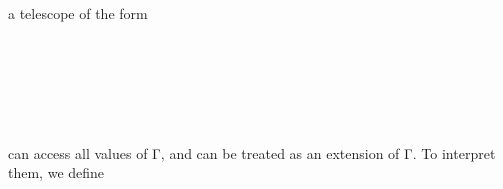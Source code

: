 \begin{code}%
%
\>[2]\AgdaSpace{}%
%
\>[11]\AgdaSpace{}%
\AgdaSpace{}%
\AgdaSymbol{=}\AgdaSpace{}%
\<%
\\
%
\>[2]\AgdaSpace{}%
\AgdaSpace{}%
\AgdaSpace{}%
%
\>[11]\AgdaSpace{}%
\AgdaSpace{}%
\AgdaSymbol{=}\AgdaSpace{}%
\AgdaFunction{Σ[}\AgdaSpace{}%
\AgdaSpace{}%
\AgdaSpace{}%
\AgdaSpace{}%
\AgdaSpace{}%
\AgdaSpace{}%
\AgdaSpace{}%
\AgdaFunction{]}\AgdaSpace{}%
\AgdaSpace{}%
\AgdaSymbol{(}\AgdaSpace{}%
\AgdaOperator{\AgdaInductiveConstructor{,}}\AgdaSpace{}%
\AgdaSymbol{)}\<%
\end{code}
a telescope of the form
\begin{code}%
%
\>[2]\AgdaSpace{}%
\AgdaSymbol{:}\AgdaSpace{}%
\AgdaSpace{}%
\AgdaSpace{}%
\AgdaSpace{}%
\<%
\\
%
\>[2]\AgdaSpace{}%
\AgdaSpace{}%
\AgdaSymbol{=}\AgdaSpace{}%
\AgdaSpace{}%
\AgdaSymbol{(}\AgdaSpace{}%
\AgdaSpace{}%
\AgdaSpace{}%
\AgdaSymbol{)}\<%
\end{code}
\begin{code}[hide]%
%
\>[2]\AgdaSpace{}%
\<%
\\
\>[2][@{}l@{\AgdaIndent{0}}]%
\>[4]\AgdaSpace{}%
\AgdaSpace{}%
\AgdaSymbol{:}\AgdaSpace{}%
\AgdaSpace{}%
\<%
\\
%
\>[4]\AgdaSpace{}%
\AgdaSpace{}%
\AgdaSymbol{:}\AgdaSpace{}%
\AgdaSpace{}%
\<%
\\
%
\>[4]\AgdaSpace{}%
\AgdaSymbol{:}\AgdaSpace{}%
\<%
\end{code}
can access all values of Γ, and can be treated as an extension of Γ. To interpret them, we define
